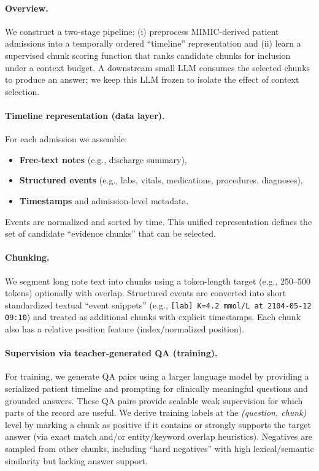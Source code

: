 \paragraph{Overview.}
We construct a two-stage pipeline: (i) preprocess MIMIC-derived patient admissions into a temporally ordered ``timeline'' representation and (ii) learn a supervised chunk scoring function that ranks candidate chunks for inclusion under a context budget. A downstream small LLM consumes the selected chunks to produce an answer; we keep this LLM frozen to isolate the effect of context selection.

\paragraph{Timeline representation (data layer).}
For each admission we assemble:
\begin{itemize}
    \item \textbf{Free-text notes} (e.g., discharge summary),
    \item \textbf{Structured events} (e.g., labs, vitals, medications, procedures, diagnoses),
    \item \textbf{Timestamps} and admission-level metadata.
\end{itemize}
Events are normalized and sorted by time. This unified representation defines the set of candidate ``evidence chunks'' that can be selected.

\paragraph{Chunking.}
We segment long note text into chunks using a token-length target (e.g., 250--500 tokens) optionally with overlap. Structured events are converted into short standardized textual ``event snippets'' (e.g., \texttt{[lab] K=4.2 mmol/L at 2104-05-12 09:10}) and treated as additional chunks with explicit timestamps. Each chunk also has a relative position feature (index/normalized position).

\paragraph{Supervision via teacher-generated QA (training).}
For training, we generate QA pairs using a larger language model by providing a serialized patient timeline and prompting for clinically meaningful questions and grounded answers. These QA pairs provide scalable weak supervision for which parts of the record are useful. We derive training labels at the \emph{(question, chunk)} level by marking a chunk as positive if it contains or strongly supports the target answer (via exact match and/or entity/keyword overlap heuristics). Negatives are sampled from other chunks, including ``hard negatives'' with high lexical/semantic similarity but lacking answer support.


